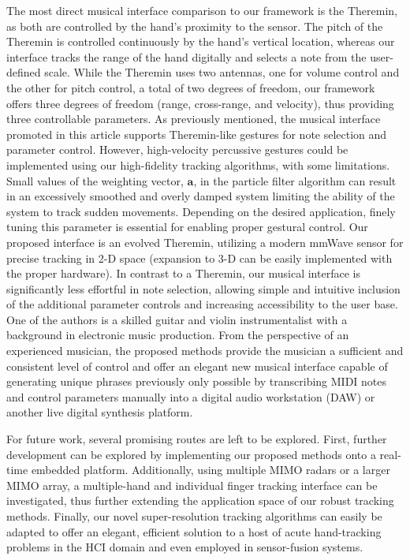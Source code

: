 \documentclass[10pt,journal,final]{IEEEtran}
\begin{document}
The most direct musical interface comparison to our framework is the Theremin, as both are controlled by the hand's proximity to the sensor. 
The pitch of the Theremin is controlled continuously by the hand's vertical location, whereas our interface tracks the range of the hand digitally and selects a note from the user-defined scale. 
While the Theremin uses two antennas, one for volume control and the other for pitch control, a total of two degrees of freedom, our framework offers three degrees of freedom (range, cross-range, and velocity), thus providing three controllable parameters.
As previously mentioned, the musical interface promoted in this article supports Theremin-like gestures for note selection and parameter control.
However, high-velocity percussive gestures could be implemented using our high-fidelity tracking algorithms, with some limitations.
Small values of the weighting vector, $\mathbf{a}$, in the particle filter algorithm can result in an excessively smoothed and overly damped system limiting the ability of the system to track sudden movements. 
Depending on the desired application, finely tuning this parameter is essential for enabling proper gestural control.
Our proposed interface is an evolved Theremin, utilizing a modern mmWave sensor for precise tracking in 2-D space (expansion to 3-D can be easily implemented with the proper hardware). 
In contrast to a Theremin, our musical interface is significantly less effortful in note selection, allowing simple and intuitive inclusion of the additional parameter controls and increasing accessibility to the user base.
One of the authors is a skilled guitar and violin instrumentalist with a background in electronic music production.
From the perspective of an experienced musician, the proposed methods provide the musician a sufficient and consistent level of control and offer an elegant new musical interface capable of generating unique phrases previously only possible by transcribing MIDI notes and control parameters manually into a digital audio workstation (DAW) or another live digital synthesis platform. 

For future work, several promising routes are left to be explored. 
First, further development can be explored by implementing our proposed methods onto a real-time embedded platform.
Additionally, using multiple MIMO radars or a larger MIMO array, a multiple-hand and individual finger tracking interface can be investigated, thus further extending the application space of our robust tracking methods.
Finally, our novel super-resolution tracking algorithms can easily be adapted to offer an elegant, efficient solution to a host of acute hand-tracking problems in the HCI domain and even employed in sensor-fusion systems. 
\end{document}
